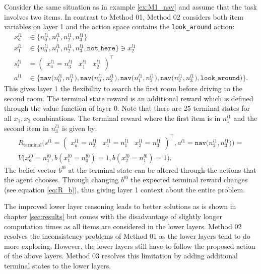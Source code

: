 \begin{example}\label{ex:M2_nav}
Consider the same situation as in example \ref{ex:M1_nav} and assume that the task involves two items. In contrast to Method 01, Method 02 considers both item variables on layer 1 and the action space contains the \texttt{look\_around} action:
\begin{equation}
    \begin{aligned}
         x_a^{l1} &\in \big\{n_0^{l1}, n_1^{l1}, n_2^{l1}, n_3^{l1}  \big\} \\
         x_1^{l1} &\in \big\{n_0^{l1}, n_1^{l1}, n_2^{l1}, n_3^{l1}, \texttt{not\_here} \big\} \ni x_2^{l1}\\
        s_t^{l1} &= \begin{pmatrix}x_a^{l1}=n_3^{l1} & x_1^{l1} & x_2^{l1} \end{pmatrix}^\intercal\\
        a^{l1} &\in \big\{\texttt{nav($n_0^{l1}, n_1^{l1}$)}, \texttt{nav($n_0^{l1}, n_2^{l1}$)}, \texttt{nav($n_1^{l1}, n_2^{l1}$)},\texttt{nav($n_2^{l1}, n_3^{l1}$)}, \texttt{look\_around)} \big\}.
    \end{aligned}
\end{equation}
This gives layer 1 the flexibility to search the first room before driving to the second room. The terminal state reward is an additional reward which is defined through the value function of layer 0. Note that there are 25 terminal states for all $x_1, x_2$ combinations. The terminal reward where the first item is in $n_1^{l1}$ and the second item in $n_3^{l1}$ is given by:  
\begin{multline}
    R_\text{terminal}\big(s^{l1}=\begin{pmatrix} x_a^{l1}=n_2^{l1} & x_1^{l1} = n_1^{l1} & x_2^{l1} = n_3^{l1} \end{pmatrix}^\intercal, a^{l1}=\texttt{nav($n_2^{l1},n_3^{l1}$)}\big)=\\
    V\big( x_a^{l0}=n_1^{l0}, b(x_1^{l0}=n_0^{l0})=1, b(x_2^{l0}=n_1^{l0})=1 \big).
\end{multline}
The belief vector $b^{l0}$ at the terminal state can be altered through the actions that the agent chooses. Through changing $b^{l0}$ the expected terminal reward changes (see equation \ref{eq:R_b}), thus giving layer 1 context about the entire problem. 
\demo
\end{example}
The improved lower layer reasoning leads to better solutions as is shown in chapter \ref{sec:results} but comes with the disadvantage of slightly longer computation times as all items are considered in the lower layers. Method 02 resolves the inconsistency problems of Method 01 as the lower layers tend to do more exploring. However, the lower layers still have to follow the proposed action of the above layers. Method 03 resolves this limitation by adding additional terminal states to the lower layers.
